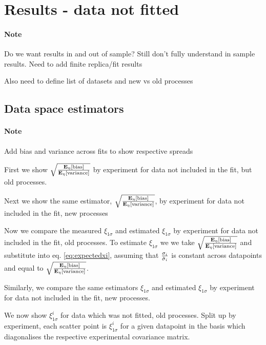 \section{Results - data not fitted}
\paragraph{Note}{Do we want results in and out of sample? Still don't
fully understand in sample results. Need to add finite replica/fit results}

Also need to define list of datasets and new vs old processes

\subsection{Data space estimators}

\paragraph{Note}{Add bias and variance across fits to show respective spreads}

First we show $\sqrt{\frac{\mathbf{E}_{\eta}\left[ {\rm bias} \right]}{\mathbf{E}_{\eta}\left[ {\rm variance} \right]}}$ by experiment for data
not included in the fit, but old processes.



Next we show the same estimator, $\sqrt{\frac{\mathbf{E}_{\eta}\left[ {\rm bias} \right]}{\mathbf{E}_{\eta}\left[ {\rm variance} \right]}}$, by
experiment for data not included in the fit, new processes



Now we compare the measured $\xi_{1\sigma}$ and estimated $\xi_{1\sigma}$ by experiment
for data not included in the fit, old processes. To estimate $\xi_{1\sigma}$
we we take $\sqrt{\frac{\mathbf{E}_{\eta}\left[ {\rm bias} \right]}{\mathbf{E}_{\eta}\left[ {\rm variance} \right]}}$ and substitute into
eq. \eqref{eq:expectedxi}, assuming that $\frac{\sigma_i}{\hat{\sigma}_i}$ is
constant across datapoints and equal to $\sqrt{\frac{\mathbf{E}_{\eta}\left[ {\rm bias} \right]}{\mathbf{E}_{\eta}\left[ {\rm variance} \right]}}$.



Similarly, we compare the same estimators $\xi_{1\sigma}$ and estimated
$\xi_{1\sigma}$ by experiment for data not included in the fit, new processes.



We now show $\xi_{1\sigma}^{i}$ for data which was not fitted, old processes. Split
up by experiment, each scatter point is $\xi_{1\sigma}^{i}$ for a given datapoint
in the basis which diagonalises the respective experimental covariance matrix.

